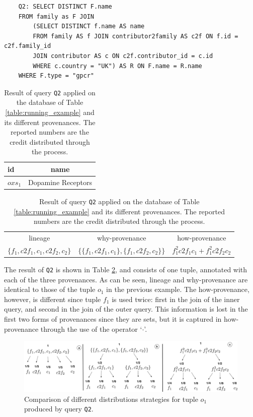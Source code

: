 {\footnotesize
\begin{adjustwidth}{25pt}{5pt}
\begin{verbatim}
	Q2: SELECT DISTINCT F.name 
	FROM family as F JOIN
		(SELECT DISTINCT f.name AS name
		FROM family AS f JOIN contributor2family AS c2f ON f.id = c2f.family_id
		JOIN contributor AS c ON c2f.contributor_id = c.id
		WHERE c.country = "UK") AS R ON F.name = R.name
	WHERE F.type = "gpcr"
\end{verbatim}	
\end{adjustwidth}
}

\begin{table}[]
\centering
  \begin{tabular}{|l|c|}
  \hline
    id & name\\
    \hline
    $oxs_1$ &  Dopamine Receptors\\
    \hline
  \end{tabular}
  \newline
\vspace{2mm}
  \begin{tabular}{c | c | c}
  	lineage & why-provenance & how-provenance   \\
  	$\{f_1, c2f_1, c_1, c2f_2, c_2\}$ & $\{\{f_1, c2f_1, c_1\}, \{f_1, c2f_2, c_2\}\}$ & $f_1^2 c2f_1 c_1 + f_1^2 c2f_2 c_2$\\
  \end{tabular}
    \caption{Result of query \texttt{Q2} applied on the database of Table \ref{table:running_example} and its different provenances. The reported numbers are the credit distributed through the process.}
  \label{table:difference_result}
\end{table}

The result of \texttt{Q2} is shown in Table \ref{table:difference_result}, and consists of one tuple, annotated with each of the three provenances. As can be seen, lineage and why-provenance are identical to those of the tuple $o_1$ in the previous example. 
The how-provenance, however, is different since tuple $f_1$ is used twice: first in the join of the inner query, and second in the join of the outer query. This information is lost in the first two forms of provenances since they are sets, but it is captured in how-provenance through the use of the operator `$\cdot$'.


\begin{figure}[]
  \includegraphics[width=\textwidth]{figures/how_distribution}
  \caption{Comparison of different distributions strategies for tuple $o_1$ produced by query \texttt{Q2}.}
  \label{figure:distributions_differences}
\end{figure}


